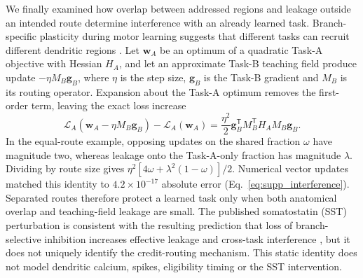 We finally examined how overlap between addressed regions and leakage outside
an intended route determine interference with an already learned task.
Branch-specific plasticity during motor learning suggests that different
tasks can recruit different dendritic regions \citep{cichon2015branch}. Let
$\bm w_A$ be an optimum of a quadratic Task-A objective with Hessian $H_A$,
and let an approximate Task-B teaching field produce update
$-\eta M_B\bm g_B$, where $\eta$ is the step size, $\bm g_B$ is the Task-B
gradient and $M_B$ is its routing operator. Expansion about the Task-A optimum removes the first-order
term, leaving the exact loss increase
\begin{equation}
\mathcal L_A(\bm w_A-\eta M_B\bm g_B)-\mathcal L_A(\bm w_A)
=\frac{\eta^2}{2}\bm g_B^\mathsf{T}M_B^\mathsf{T}H_AM_B\bm g_B.
\label{eq:supp_interference}
\end{equation}
In the equal-route example, opposing updates on the shared fraction $\omega$
have magnitude two, whereas leakage onto the Task-A-only fraction has
magnitude $\lambda$. Dividing by route size gives
$\eta^2[4\omega+\lambda^2(1-\omega)]/2$. Numerical vector updates matched this
identity to $4.2\times10^{-17}$ absolute error
(Eq.~\ref{eq:supp_interference}). Separated routes therefore
protect a learned task only when both anatomical overlap and teaching-field
leakage are small. The published somatostatin (SST) perturbation is consistent with the
resulting prediction that loss of branch-selective inhibition increases
effective leakage and cross-task interference \citep{cichon2015branch}, but it
does not uniquely identify the credit-routing mechanism. This static identity
does not model dendritic calcium, spikes, eligibility timing or the SST intervention.
